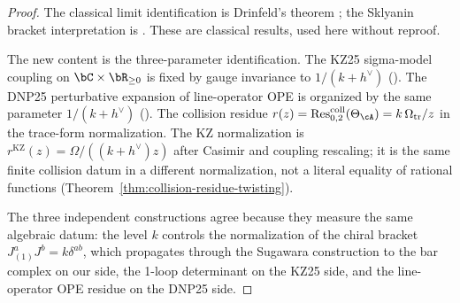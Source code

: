 \begin{proof}
The classical limit identification is Drinfeld's theorem
\cite{Drinfeld85}; the Sklyanin bracket interpretation is
\cite{STS83}. These are classical results, used here without reproof.

The new content is the three-parameter identification. The KZ\textup{25}
sigma-model coupling on $\bC\times\bR_{\geq 0}$ is fixed by gauge
invariance to $1/(k+h^\vee)$ \textup{(\cite[\S\,2.2]{KhanZeng25})}.
The DNP\textup{25} perturbative expansion of line-operator OPE is organized
by the same parameter $1/(k+h^\vee)$ \textup{(\cite[\S\,3]{DNP25})}.
The collision residue
$r(z) = \operatorname{Res}^{\mathrm{coll}}_{0,2}(\Theta_\cA)
= k\,\Omega_{\mathrm{tr}}/z$
in the trace-form normalization. The KZ normalization is
$r^{\mathrm{KZ}}(z)=\Omega/((k+h^\vee)z)$ after Casimir and coupling
rescaling; it is the same finite collision datum in a different
normalization, not a literal equality of rational functions
\textup{(}Theorem~\textup{\ref{thm:collision-residue-twisting}}\textup{)}.

The three independent constructions agree because they measure the
same algebraic datum: the level $k$ controls the normalization of the
chiral bracket $J^a_{(1)}J^b = k\delta^{ab}$, which propagates through
the Sugawara construction to the bar complex on our side, the 1-loop
determinant on the KZ\textup{25} side, and the line-operator OPE residue on
the DNP\textup{25} side.
\end{proof}

